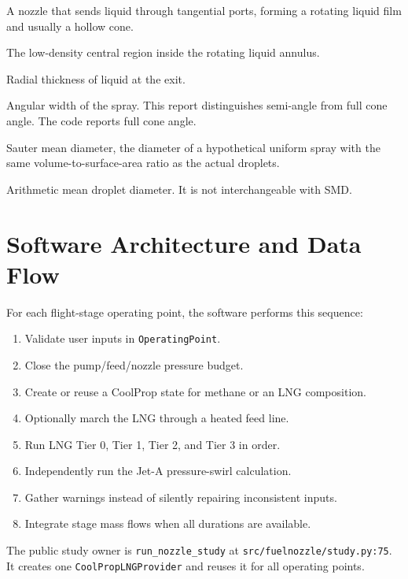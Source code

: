 \documentclass[11pt]{article}
\newcommand{\code}[1]{\nolinkurl{#1}}
\newcommand{\srcline}[2]{\nolinkurl{#1:#2}}
\begin{document}
\begin{description}[style=nextline]
  \item[Pressure-swirl atomizer] A nozzle that sends liquid through tangential ports,
  forming a rotating liquid film and usually a hollow cone.
  \item[Air core] The low-density central region inside the rotating liquid annulus.
  \item[Film thickness] Radial thickness of liquid at the exit.
  \item[Cone angle] Angular width of the spray. This report distinguishes semi-angle
  from full cone angle. The code reports full cone angle.
  \item[SMD or $D_{32}$] Sauter mean diameter, the diameter of a hypothetical uniform
  spray with the same volume-to-surface-area ratio as the actual droplets.
  \item[$D_{10}$] Arithmetic mean droplet diameter. It is not interchangeable with SMD.
\end{description}

\section{Software Architecture and Data Flow}

For each flight-stage operating point, the software performs this sequence:

\begin{enumerate}
  \item Validate user inputs in \code{OperatingPoint}.
  \item Close the pump/feed/nozzle pressure budget.
  \item Create or reuse a CoolProp state for methane or an LNG composition.
  \item Optionally march the LNG through a heated feed line.
  \item Run LNG Tier 0, Tier 1, Tier 2, and Tier 3 in order.
  \item Independently run the Jet-A pressure-swirl calculation.
  \item Gather warnings instead of silently repairing inconsistent inputs.
  \item Integrate stage mass flows when all durations are available.
\end{enumerate}

The public study owner is \code{run_nozzle_study} at
\srcline{src/fuelnozzle/study.py}{75}. It creates one
\code{CoolPropLNGProvider} and reuses it for all operating points.
\end{document}
